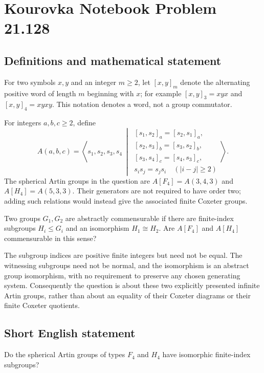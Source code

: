 \documentclass[11pt,a4paper]{article}
\begin{document}
\section*{Kourovka Notebook Problem 21.128}\label{statement}

\subsection{Definitions and mathematical statement}
For two symbols $x,y$ and an integer $m\ge2$, let $[x,y]_m$ denote the alternating positive word of length $m$ beginning with $x$; for example $[x,y]_3=xyx$ and $[x,y]_4=xyxy$. This notation denotes a word, not a group commutator.

For integers $a,b,c\ge2$, define
\[
 A(a,b,c)=\left\langle s_1,s_2,s_3,s_4\ \middle|\
 \begin{array}{l}
 [s_1,s_2]_a=[s_2,s_1]_a,\\
 {}[s_2,s_3]_b=[s_3,s_2]_b,\\
 {}[s_3,s_4]_c=[s_4,s_3]_c,\\
 s_is_j=s_js_i\quad(|i-j|\ge2)
 \end{array}\right\rangle.
\]
The spherical Artin groups in the question are $A[F_4]=A(3,4,3)$ and $A[H_4]=A(5,3,3)$. Their generators are not required to have order two; adding such relations would instead give the associated finite Coxeter groups.

Two groups $G_1,G_2$ are abstractly commensurable if there are finite-index subgroups $H_i\le G_i$ and an isomorphism $H_1\cong H_2$. Are $A[F_4]$ and $A[H_4]$ commensurable in this sense?

The subgroup indices are positive finite integers but need not be equal. The witnessing subgroups need not be normal, and the isomorphism is an abstract group isomorphism, with no requirement to preserve any chosen generating system. Consequently the question is about these two explicitly presented infinite Artin groups, rather than about an equality of their Coxeter diagrams or their finite Coxeter quotients.
\subsection{Short English statement}
Do the spherical Artin groups of types $F_4$ and $H_4$ have isomorphic finite-index subgroups?
\end{document}
